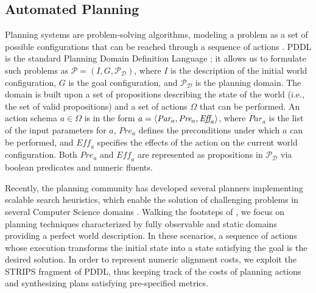 
\subsection{Automated Planning}\label{ssec:ap}
Planning systems are problem-solving algorithms, modeling a problem as a set of possible configurations that can be reached through a sequence of actions \cite{APlan}. PDDL is the standard Planning Domain Definition Language \cite{fox2003}; it allows us to formulate such problems as $\mathcal{P}=(I,G,\mathcal{P}_\mathcal{D})$, where $I$ is the description of the initial world configuration, $G$ is the goal configuration, and $\mathcal{P}_\mathcal{D}$ is the planning domain. The domain is built upon a set of propositions describing the state of the world (i.e., the set of valid propositions) and a set of actions $\Omega$ that can be performed. An action schema $a\in \Omega$ is in the form $a=\Braket{\textit{Par}_a,\textit{Pre}_a,\textit{Eff}_a}$, where $\textit{Par}_a$ is the list of the input parameters for $a$, $\textit{Pre}_a$ defines the preconditions under which $a$ can be performed, and $\textit{Eff}_a$ specifies the effects of the action on the current world configuration. Both $\textit{Pre}_a$ and $\textit{Eff}_a$ are represented as propositions in $\mathcal{P}_\mathcal{D}$ via boolean predicates and numeric fluents.

Recently, the planning community has developed several planners implementing scalable search heuristics, which enable the solution of challenging problems in several Computer Science domains \cite{Marrella17}. Walking  the footsteps of \cite{XuLZ17a}, we focus on planning techniques characterized by fully observable and static domains providing a perfect world description. In these scenarios, a sequence of actions whose execution transforms the initial state into a state satisfying the goal is the desired solution. In order to represent numeric alignment costs, we exploit the STRIPS fragment of PDDL, thus keeping track of the costs of planning actions and synthesizing plans satisfying pre-specified metrics.

